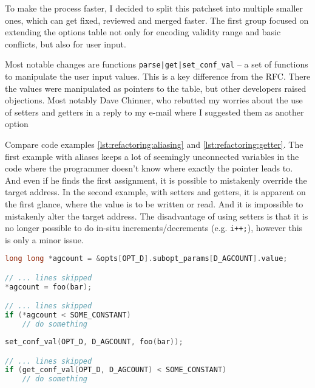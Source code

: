To make the process faster, I decided to split this patchset into multiple
smaller ones, which can get fixed, reviewed and merged faster. The first
group focused on extending the options table not only for encoding validity
range and basic conflicts, but also for user input.

Most notable changes are functions {\tt parse|get|set\_conf\_val}
-- a set of functions to manipulate the user input values. This is a key
difference from the RFC. There the values were manipulated as pointers to the
table, but other developers raised objections. Most notably Dave Chinner, who
rebutted my worries about the use of setters and getters in a reply to my e-mail where I suggested them as another option~\cite{unifyTypes1, unifyTypes2}

Compare code examples \ref{lst:refactoring:aliasing} and
\ref{lst:refactoring:getter}.  The first example with aliases keeps a lot of
seemingly unconnected variables in the code where the programmer doesn't know
where exactly the pointer leads to. And even if he finds the first assignment,
it is possible to mistakenly override the target address. In the second
example, with setters and getters, it is apparent on the first glance, where
the value is to be written or read. And it is impossible to mistakenly alter
the target address. The disadvantage of using setters is that it is no longer possible to do in-situ increments/decrements (e.g. {\tt i++;}), however this is only a minor issue.

\begin{lstlisting}[frame=none, basicstyle=\footnotesize\ttfamily,
language=C, numbers=none, numberstyle=\tiny\color{black},
label={lst:refactoring:aliasing},
caption={Pointer aliases in RFC of the second set.}]
long long *agcount = &opts[OPT_D].subopt_params[D_AGCOUNT].value;

// ... lines skipped
*agcount = foo(bar);

// ... lines skipped
if (*agcount < SOME_CONSTANT)
	// do something
\end{lstlisting}

\begin{lstlisting}[frame=none, basicstyle=\footnotesize\ttfamily,
language=C, numbers=none, numberstyle=\tiny\color{black},
label={lst:refactoring:getter},
caption={Setters and getters in later version of the second set.}]
set_conf_val(OPT_D, D_AGCOUNT, foo(bar));

// ... lines skipped
if (get_conf_val(OPT_D, D_AGCOUNT) < SOME_CONSTANT)
	// do something
\end{lstlisting}

